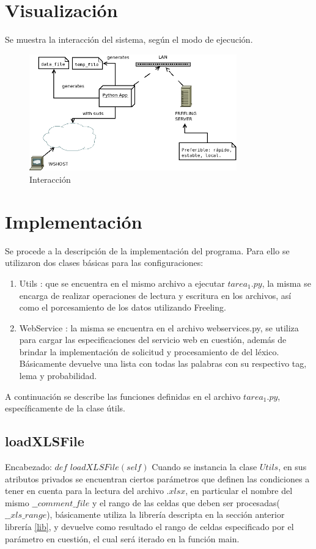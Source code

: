 \documentclass[12pt]{article}
\begin{document}
\section{Visualización}

Se muestra la interacción del sistema, según el modo de ejecución.
\begin{figure}[!h]
  \centering
    \includegraphics[width=0.8\textwidth]{./fig/arq.png}
  \caption{Interacción}
  \label{fig:arq}
\end{figure} 


\section{Implementación}
Se procede a la descripción de la implementación del programa. Para ello se utilizaron dos clases básicas para las configuraciones:
\begin{enumerate}
   \item Utils : que se encuentra en el mismo archivo a ejecutar $tarea_1.py$, la misma se encarga de realizar operaciones de lectura y escritura en los archivos, así como el porcesamiento de los datos utilizando Freeling.
   \item WebService : la misma se encuentra en el archivo webservices.py, se utiliza para cargar las especificaciones del servicio web en cuestión, además de brindar la implementación de solicitud y procesamiento de del léxico. Básicamente devuelve una lista con todas las palabras con su respectivo tag, lema y probabilidad.
 \end{enumerate} 

A continuación se describe las funciones definidas en el archivo $tarea_1.py$, específicamente de la clase útils.
\subsection{loadXLSFile}
Encabezado: $def$ $loadXLSFile(self)$
Cuando se instancia la clase $Utils$, en sus atributos privados se encuentran ciertos parámetros que definen las condiciones a tener en cuenta para la lectura del archivo $.xlsx$, en particular el nombre del mismo $\_\_comment\_file$ y el rango de las celdas que deben ser procesadas($\_\_xls\_range$), básicamente utiliza la librería descripta en la sección anterior librería \ref{lib}, y devuelve como resultado el rango de celdas especificado por el parámetro en cuestión, el cual será iterado en la función main.
\end{document}
